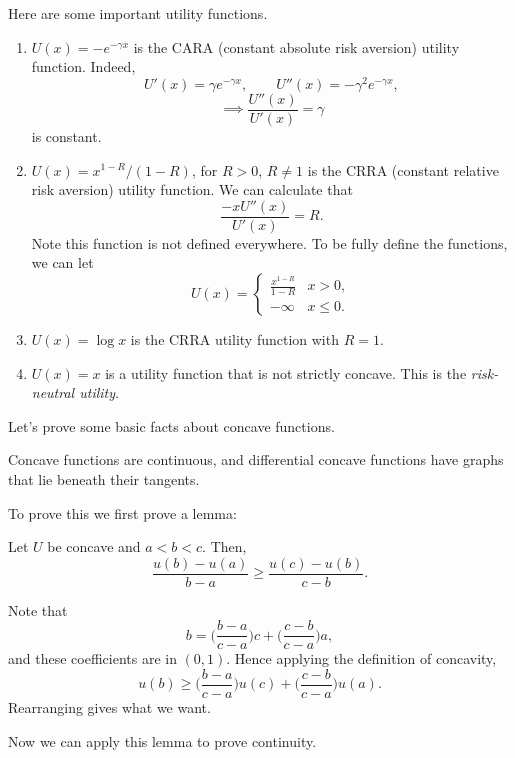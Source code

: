 \documentclass[12pt]{article}
\begin{document}
\begin{exbox}
	Here are some important utility functions.
	\begin{enumerate}
		\item $U(x) = - e^{-\gamma x}$ is the CARA (constant absolute risk aversion) utility function. Indeed,
			\[
			U'(x) = \gamma e^{-\gamma x}, \qquad U''(x) = - \gamma^2 e^{-\gamma x},
			\]
			\[
			\implies \frac{U''(x)}{U'(x)} = \gamma
			\]
			is constant.
	\item $U(x) = x^{1-R}/(1-R)$, for $R > 0$, $R \neq 1$ is the CRRA (constant relative risk aversion) utility function. We can calculate that
		\[
		\frac{-x U''(x)}{U'(x)} = R.
		\]
		Note this function is not defined everywhere. To be fully define the functions, we can let
		\[
		U(x)=
		\begin{cases}
			\frac{x^{1-R}}{1-R} & x > 0,\\
			-\infty & x \leq 0.
		\end{cases}
		\]
		\item $U(x) = \log x$ is the CRRA utility function with $R = 1$.
		\item $U(x) = x$ is a utility function that is not strictly concave. This is the \emph{risk-neutral utility}.
	\end{enumerate}
\end{exbox}

Let's prove some basic facts about concave functions.

\begin{theorem}
	Concave functions are continuous, and differential concave functions have graphs that lie beneath their tangents.
\end{theorem}

To prove this we first prove a lemma:

\begin{lemma}
	Let $U$ be concave and $a < b < c$. Then,
	\[
	\frac{u(b) - u(a)}{b - a} \geq \frac{u(c) - u(b)}{c - b}.
	\]
\end{lemma}

\begin{proofbox}
	Note that
	\[
	b = \biggl( \frac{b-a}{c-a} \biggr) c + \biggl(\frac{c-b}{c-a} \biggr)a,
	\]
	and these coefficients are in $(0, 1)$. Hence applying the definition of concavity,
	\[
		u(b) \geq \biggl( \frac{b-a}{c-a} \biggr) u(c) + \biggl( \frac{c-b}{c-a} \biggr) u(a).
	\]
	Rearranging gives what we want.
\end{proofbox}

Now we can apply this lemma to prove continuity.
\end{document}

